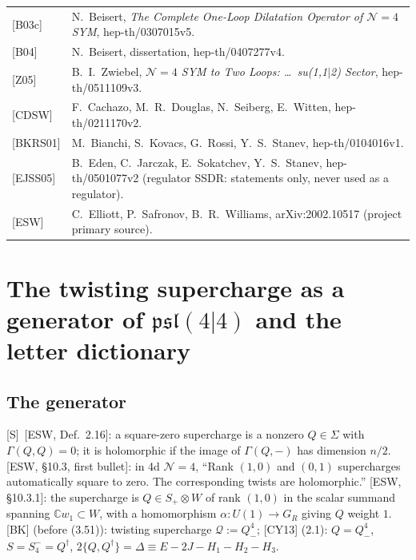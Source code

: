 \documentclass[11pt]{article}
\theoremstyle{definition}
\newcommand{\Sl}{\textup{[S]}}
\begin{document}
\begin{longtable}{p{2.3cm}p{13.7cm}}
{[B03c]} & N.~Beisert, \emph{The Complete One-Loop Dilatation Operator of $\mathcal N=4$ SYM}, hep-th/0307015v5.\\
{[B04]} & N.~Beisert, dissertation, hep-th/0407277v4.\\
{[Z05]} & B.~I.~Zwiebel, \emph{$\mathcal N=4$ SYM to Two Loops: \dots\ su(1,1$|$2) Sector}, hep-th/0511109v3.\\
{[CDSW]} & F.~Cachazo, M.~R.~Douglas, N.~Seiberg, E.~Witten, hep-th/0211170v2.\\
{[BKRS01]} & M.~Bianchi, S.~Kovacs, G.~Rossi, Y.~S.~Stanev, hep-th/0104016v1.\\
{[EJSS05]} & B.~Eden, C.~Jarczak, E.~Sokatchev, Y.~S.~Stanev, hep-th/0501077v2 (regulator SSDR: statements only, never used as a regulator).\\
{[ESW]} & C.~Elliott, P.~Safronov, B.~R.~Williams, arXiv:2002.10517 (project primary source).
\end{longtable}

\section{The twisting supercharge as a generator of $\mathfrak{psl}(4|4)$ and the letter dictionary}

\subsection{The generator}

\Sl\ [ESW, Def.~2.16]: a square-zero supercharge is a nonzero $Q\in\Sigma$ with $\Gamma(Q,Q)=0$; it is holomorphic if the image of $\Gamma(Q,-)$ has dimension $n/2$. [ESW, \S10.3, first bullet]: in 4d $\mathcal N=4$, ``Rank $(1,0)$ and $(0,1)$ supercharges automatically square to zero. The corresponding twists are holomorphic.'' [ESW, \S10.3.1]: the supercharge is $Q\in S_+\otimes W$ of rank $(1,0)$ in the scalar summand spanning $\mathbb Cw_1\subset W$, with a homomorphism $\alpha:U(1)\to G_R$ giving $Q$ weight $1$. [BK] (before (3.51)): twisting supercharge $\mathcal Q:=Q^4_-$; [CY13] (2.1): $Q=Q^4_-$, $S=S^-_4=Q^\dagger$, $2\{Q,Q^\dagger\}=\Delta\equiv E-2J-H_1-H_2-H_3$.
\end{document}
